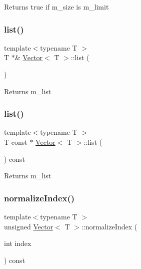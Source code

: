 \begin{DoxyReturn}{Returns}
true if m\+\_\+size is m\+\_\+limit 
\end{DoxyReturn}
\mbox{\label{classVector_aad3f85e26470d99139e3f96053bdacc4}} 
\subsubsection{\texorpdfstring{list()}{list()}\hspace{0.1cm}{\footnotesize\ttfamily [1/2]}}
{\footnotesize\ttfamily template$<$typename T $>$ \\
T $\ast$\& \hyperlink{classVector}{Vector}$<$ T $>$\+::list (\begin{DoxyParamCaption}{ }\end{DoxyParamCaption})\hspace{0.3cm}{\ttfamily [protected]}}

\begin{DoxyReturn}{Returns}
m\+\_\+list 
\end{DoxyReturn}
\mbox{\label{classVector_a2aaf129778179680e5932d96aa5471eb}} 
\subsubsection{\texorpdfstring{list()}{list()}\hspace{0.1cm}{\footnotesize\ttfamily [2/2]}}
{\footnotesize\ttfamily template$<$typename T $>$ \\
T const  $\ast$ \hyperlink{classVector}{Vector}$<$ T $>$\+::list (\begin{DoxyParamCaption}{ }\end{DoxyParamCaption}) const\hspace{0.3cm}{\ttfamily [protected]}}

\begin{DoxyReturn}{Returns}
m\+\_\+list 
\end{DoxyReturn}
\mbox{\label{classVector_a63f7ddd7328b13bc30b2243b50f70ec9}} 
\subsubsection{\texorpdfstring{normalize\+Index()}{normalizeIndex()}}
{\footnotesize\ttfamily template$<$typename T $>$ \\
unsigned \hyperlink{classVector}{Vector}$<$ T $>$\+::normalize\+Index (\begin{DoxyParamCaption}\item[{int}]{index }\end{DoxyParamCaption}) const\hspace{0.3cm}{\ttfamily [private]}}

